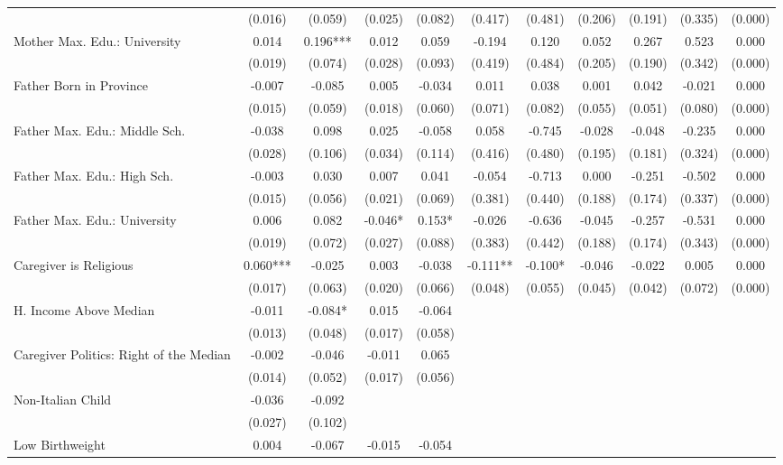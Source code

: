 \begin{tabular}{lcccccccccc}
 & (0.016) & (0.059) & (0.025) & (0.082) & (0.417) & (0.481) & (0.206) & (0.191) & (0.335) & (0.000) \\
Mother Max. Edu.: University & 0.014 & 0.196*** & 0.012 & 0.059 & -0.194 & 0.120 & 0.052 & 0.267 & 0.523 & 0.000 \\
 & (0.019) & (0.074) & (0.028) & (0.093) & (0.419) & (0.484) & (0.205) & (0.190) & (0.342) & (0.000) \\
Father Born in Province & -0.007 & -0.085 & 0.005 & -0.034 & 0.011 & 0.038 & 0.001 & 0.042 & -0.021 & 0.000 \\
 & (0.015) & (0.059) & (0.018) & (0.060) & (0.071) & (0.082) & (0.055) & (0.051) & (0.080) & (0.000) \\
Father Max. Edu.: Middle Sch. & -0.038 & 0.098 & 0.025 & -0.058 & 0.058 & -0.745 & -0.028 & -0.048 & -0.235 & 0.000 \\
 & (0.028) & (0.106) & (0.034) & (0.114) & (0.416) & (0.480) & (0.195) & (0.181) & (0.324) & (0.000) \\
Father Max. Edu.: High Sch. & -0.003 & 0.030 & 0.007 & 0.041 & -0.054 & -0.713 & 0.000 & -0.251 & -0.502 & 0.000 \\
 & (0.015) & (0.056) & (0.021) & (0.069) & (0.381) & (0.440) & (0.188) & (0.174) & (0.337) & (0.000) \\
Father Max. Edu.: University & 0.006 & 0.082 & -0.046* & 0.153* & -0.026 & -0.636 & -0.045 & -0.257 & -0.531 & 0.000 \\
 & (0.019) & (0.072) & (0.027) & (0.088) & (0.383) & (0.442) & (0.188) & (0.174) & (0.343) & (0.000) \\
Caregiver is Religious & 0.060*** & -0.025 & 0.003 & -0.038 & -0.111** & -0.100* & -0.046 & -0.022 & 0.005 & 0.000 \\
 & (0.017) & (0.063) & (0.020) & (0.066) & (0.048) & (0.055) & (0.045) & (0.042) & (0.072) & (0.000) \\
H. Income Above Median & -0.011 & -0.084* & 0.015 & -0.064 &  &  &  &  &  &  \\
 & (0.013) & (0.048) & (0.017) & (0.058) &  &  &  &  &  &  \\
Caregiver Politics: Right of the Median & -0.002 & -0.046 & -0.011 & 0.065 &  &  &  &  &  &  \\
 & (0.014) & (0.052) & (0.017) & (0.056) &  &  &  &  &  &  \\
Non-Italian Child & -0.036 & -0.092 &  &  &  &  &  &  &  &  \\
 & (0.027) & (0.102) &  &  &  &  &  &  &  &  \\
Low Birthweight & 0.004 & -0.067 & -0.015 & -0.054 &  &  &  &  &  &  \\

\end{tabular}
